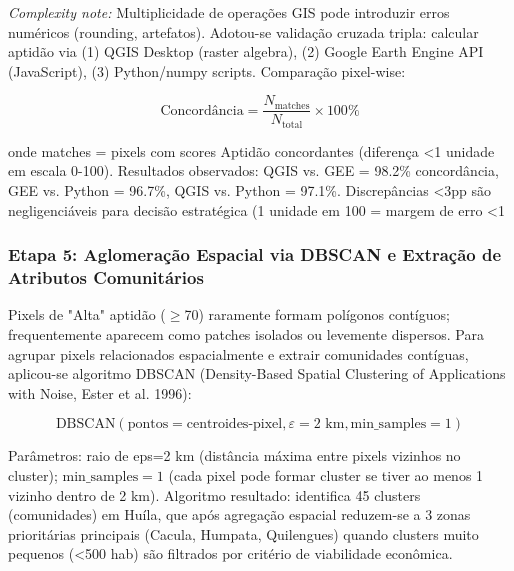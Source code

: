 \documentclass[12pt, a4paper]{article}
\begin{document}
\textit{Complexity note:} Multiplicidade de operações GIS pode introduzir erros numéricos (rounding, artefatos). Adotou-se validação cruzada tripla: calcular aptidão via (1) QGIS Desktop (raster algebra), (2) Google Earth Engine API (JavaScript), (3) Python/numpy scripts. Comparação pixel-wise:

\begin{equation}
\text{Concordância} = \frac{N_{\text{matches}}}{N_{\text{total}}} \times 100\%
\end{equation}

onde matches = pixels com scores Aptidão concordantes (diferença <1 unidade em escala 0-100). Resultados observados: QGIS vs. GEE = 98.2\% concordância, GEE vs. Python = 96.7\%, QGIS vs. Python = 97.1\%. Discrepâncias <3pp são negligenciáveis para decisão estratégica (1 unidade em 100 = margem de erro <1%

\subsubsection{Etapa 5: Aglomeração Espacial via DBSCAN e Extração de Atributos Comunitários}

Pixels de "Alta" aptidão ($\geq$70) raramente formam polígonos contíguos; frequentemente aparecem como patches isolados ou levemente dispersos. Para agrupar pixels relacionados espacialmente e extrair comunidades contíguas, aplicou-se algoritmo DBSCAN (Density-Based Spatial Clustering of Applications with Noise, Ester et al. 1996):

\begin{equation}
\text{DBSCAN}(\text{pontos} = \text{centroides-pixel}, \varepsilon = 2 \text{ km}, \text{min\_samples} = 1)
\end{equation}

Parâmetros: raio de eps=2 km (distância máxima entre pixels vizinhos no cluster); $\text{min\_samples}=1$ (cada pixel pode formar cluster se tiver ao menos 1 vizinho dentro de 2 km). Algoritmo resultado: identifica 45 clusters (comunidades) em Huíla, que após agregação espacial reduzem-se a 3 zonas prioritárias principais (Cacula, Humpata, Quilengues) quando clusters muito pequenos (<500 hab) são filtrados por critério de viabilidade econômica.
\end{document}
